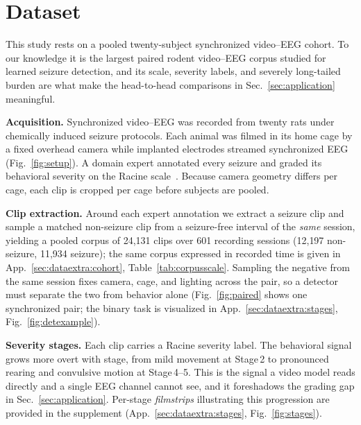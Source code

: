 \section{Dataset}
\label{sec:data}

This study rests on a pooled twenty-subject synchronized video--EEG cohort. To our knowledge it is the largest paired rodent video--EEG
corpus studied for learned seizure detection, and its scale, severity labels, and
severely long-tailed burden are what make the head-to-head comparisons in
Sec.~\ref{sec:application} meaningful.

\noindent\textbf{Acquisition.}
Synchronized video--EEG was recorded from twenty rats under chemically induced
seizure protocols. Each animal was filmed in its home cage by a fixed overhead
camera while implanted electrodes streamed synchronized EEG
(Fig.~\ref{fig:setup}). A domain expert annotated every seizure and graded its
behavioral severity on the Racine scale~\cite{racine1972}. Because camera
geometry differs per cage, each clip is cropped per cage before subjects are
pooled.

\noindent\textbf{Clip extraction.}
Around each expert annotation we extract a seizure clip and sample a matched
non-seizure clip from a seizure-free interval of the \emph{same} session,
yielding a pooled corpus of 24{,}131 clips over 601 recording sessions
(12{,}197 non-seizure, 11{,}934 seizure); the same corpus expressed in recorded
time is given in App.~\ref{sec:dataextra:cohort}, Table~\ref{tab:corpusscale}. Sampling the negative from the same
session fixes camera, cage, and lighting across the pair, so a detector must
separate the two from behavior alone (Fig.~\ref{fig:paired} shows one
synchronized pair; the binary task is visualized in App.~\ref{sec:dataextra:stages},
Fig.~\ref{fig:detexample}).


\noindent\textbf{Severity stages.}
Each clip carries a Racine severity label. The behavioral signal grows more overt
with stage, from mild movement at Stage\,2 to pronounced rearing and convulsive
motion at Stage\,4--5. This is the signal a video model reads directly and a
single EEG channel cannot see, and it foreshadows the grading gap in
Sec.~\ref{sec:application}. Per-stage \emph{filmstrips} illustrating this
progression are provided in the supplement (App.~\ref{sec:dataextra:stages},
Fig.~\ref{fig:stages}).


